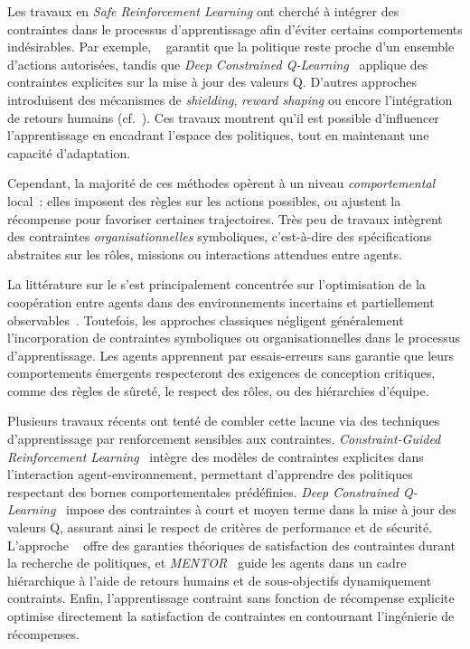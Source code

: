 \medskip

\noindent
Les travaux en \textit{Safe Reinforcement Learning} ont cherché à intégrer des contraintes dans le processus d'apprentissage afin d'éviter certains comportements indésirables. Par exemple, ~\cite{achiam2017constrained} garantit que la politique reste proche d'un ensemble d'actions autorisées, tandis que \textit{Deep Constrained Q-Learning}~\cite{kalweit2020deep} applique des contraintes explicites sur la mise à jour des valeurs Q. D'autres approches introduisent des mécanismes de \textit{shielding}, \textit{reward shaping} ou encore l'intégration de retours humains (cf.~\cite{zhou2025mentor}). Ces travaux montrent qu'il est possible d'influencer l'apprentissage en encadrant l'espace des politiques, tout en maintenant une capacité d'adaptation.

\noindent
Cependant, la majorité de ces méthodes opèrent à un niveau \textit{comportemental} local~: elles imposent des règles sur les actions possibles, ou ajustent la récompense pour favoriser certaines trajectoires. Très peu de travaux intègrent des contraintes \textit{organisationnelles} symboliques, c'est-à-dire des spécifications abstraites sur les rôles, missions ou interactions attendues entre agents.

\medskip

\noindent
La littérature sur le  s'est principalement concentrée sur l'optimisation de la coopération entre agents dans des environnements incertains et partiellement observables~\cite{Zhang2021, Papoudakis2021}. Toutefois, les approches classiques négligent généralement l'incorporation de contraintes symboliques ou organisationnelles dans le processus d'apprentissage. Les agents apprennent par essais-erreurs sans garantie que leurs comportements émergents respecteront des exigences de conception critiques, comme des règles de sûreté, le respect des rôles, ou des hiérarchies d'équipe.

\noindent
Plusieurs travaux récents ont tenté de combler cette lacune via des techniques d'apprentissage par renforcement sensibles aux contraintes. \textit{Constraint-Guided Reinforcement Learning}~\cite{spieker2021constraint} intègre des modèles de contraintes explicites dans l'interaction agent-environnement, permettant d'apprendre des politiques respectant des bornes comportementales prédéfinies. \textit{Deep Constrained Q-Learning}~\cite{kalweit2020deep} impose des contraintes à court et moyen terme dans la mise à jour des valeurs Q, assurant ainsi le respect de critères de performance et de sécurité. L'approche ~\cite{achiam2017constrained} offre des garanties théoriques de satisfaction des contraintes durant la recherche de politiques, et \textit{MENTOR}~\cite{zhou2025mentor} guide les agents dans un cadre hiérarchique à l'aide de retours humains et de sous-objectifs dynamiquement contraints. Enfin, l'apprentissage contraint sans fonction de récompense explicite~\cite{miryoosefi2022} optimise directement la satisfaction de contraintes en contournant l'ingénierie de récompenses.

